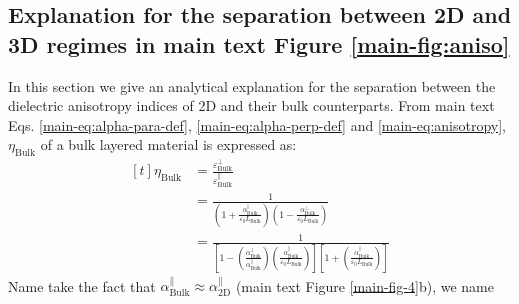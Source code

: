 \documentclass[manuscript=suppinfo,email=true,hyperref=true,keywords=false]{achemso}
\begin{document}
\subsection{Explanation for the separation between 2D and 3D regimes in main text Figure \ref{main-fig:aniso}}
\label{sssec:aniso-2}
In this section we give an analytical explanation for the separation
between the dielectric anisotropy indices of 2D and their bulk
counterparts. From main text Eqs. \ref{main-eq:alpha-para-def},
\ref{main-eq:alpha-perp-def} and \ref{main-eq:anisotropy},
$\eta_{\mathrm{Bulk}}$ of a bulk layered material is expressed as:
\begin{equation}
  \label{eq:eta-bulk}
  \begin{aligned}[t]
    \eta_{\mathrm{Bulk}} &= \frac{\varepsilon_{\mathrm{Bulk}}^{\perp}}
    {\varepsilon_{\mathrm{Bulk}}^{\parallel}}\\
    &= \frac{1}{\left(1 + {\displaystyle
          \frac{\alpha_{\mathrm{Bulk}}^{\parallel}}{\varepsilon_{0}L_{\mathrm{Bulk}}}}\right)
      \left(1 - {\displaystyle \frac{\alpha_{\mathrm{Bulk}}^{\perp}}{\varepsilon_{0}L_{\mathrm{Bulk}}}} \right)}\\
    &= \frac{1}{ \left[1-\left( {\displaystyle
            \frac{\alpha_{\mathrm{Bulk}}^{\perp}}{\alpha_{\mathrm{Bulk}}^{\parallel}}}\right)
        \left(
          {\displaystyle \frac{\alpha_{\mathrm{Bulk}}^{\parallel}}{\varepsilon_{0}
            L_{\mathrm{Bulk}}}} \right) \right]
      \left[ 1 + \left(
          {\displaystyle \frac{\alpha_{\mathrm{Bulk}}^{\parallel}}{\varepsilon_{0}
            L_{\mathrm{Bulk}}}} \right)\right]
    }
  \end{aligned}
\end{equation}
Name take the fact that
$\alpha_{\mathrm{Bulk}}^{\parallel} \approx
\alpha^{\parallel}_{\mathrm{2D}}$ (main text Figure
\ref{main-fig-4}b), we name
\end{document}
